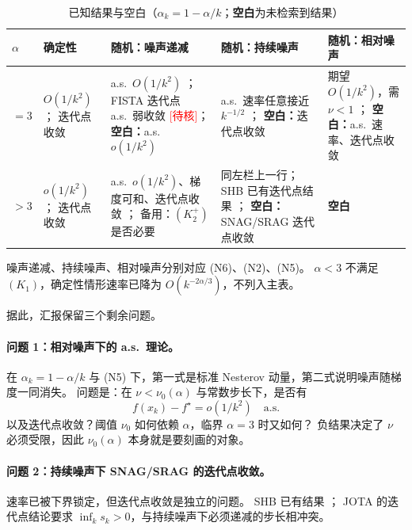 \documentclass[11pt]{ctexart}
\newcommand{\tbv}{\textcolor{red}{[待核]}}
\begin{document}
\begin{table}[htbp]
\centering
\small
\renewcommand{\arraystretch}{1.3}
\caption{已知结果与空白（$\alpha_k=1-\alpha/k$；\textbf{空白}为未检索到结果）}
\label{tab:gaps}
\begin{tabularx}{\textwidth}{@{}p{1.0cm}YYYY@{}}
\toprule
$\alpha$ & 确定性 & 随机：噪声递减 & 随机：持续噪声 & 随机：相对噪声 \\
\midrule
$=3$
& $O(1/k^2)$ \citep{nesterov1983,beck2009fista}；
  迭代点收敛 \citep{jang2025point,bot2025iterates}
& a.s.\ $O(1/k^2)$ \citep{attouch2026ravine}；
  FISTA 迭代点 a.s.\ 弱收敛 \citep{salzo2025iterates}\tbv；
  \textbf{空白：}a.s.\ $o(1/k^2)$
& a.s.\ 速率任意接近 $k^{-1/2}$ \citep{attouch2026ravine}；
  \textbf{空白：}迭代点收敛
& 期望 $O(1/k^2)$，需 $\nu<1$ \citep{gupta2024nesterov}；
  \textbf{空白：}a.s.\ 速率、迭代点收敛 \\
\addlinespace
$>3$
& $o(1/k^2)$ \citep{attouch2016rate}；
  迭代点收敛 \citep{chambolle2015}
& a.s.\ $o(1/k^2)$、梯度可和、迭代点收敛 \citep{attouch2026ravine}；
  备用：$(K_2^+)$ 是否必要
& 同左栏上一行；SHB 已有迭代点结果 \citep{sebbouh2021,liu2022}；
  \textbf{空白：}SNAG/SRAG 迭代点收敛
& \textbf{空白} \\
\bottomrule
\end{tabularx}

\vspace{2mm}
\begin{minipage}{0.96\textwidth}
\footnotesize
噪声递减、持续噪声、相对噪声分别对应 (N6)、(N2)、(N5)。
$\alpha<3$ 不满足 $(K_1)$，确定性情形速率已降为 $O(k^{-2\alpha/3})$，不列入主表。
\end{minipage}
\end{table}

据此，汇报保留三个剩余问题。

\paragraph{问题 1：相对噪声下的 a.s.\ 理论。}
在 $\alpha_k=1-\alpha/k$ 与 (N5) 下，第一式是标准 Nesterov 动量，第二式说明噪声随梯度一同消失。
问题是：在 $\nu<\nu_0(\alpha)$ 与常数步长下，是否有
\[
f(x_k)-f^\star=o(1/k^2)\quad\text{a.s.}
\]
以及迭代点收敛？阈值 $\nu_0$ 如何依赖 $\alpha$，临界 $\alpha=3$ 时又如何？
负结果决定了 $\nu$ 必须受限，因此 $\nu_0(\alpha)$ 本身就是要刻画的对象。

\paragraph{问题 2：持续噪声下 SNAG/SRAG 的迭代点收敛。}
速率已被下界锁定，但迭代点收敛是独立的问题。
SHB 已有结果 \citep{sebbouh2021,liu2022}；
JOTA 的迭代点结论要求 $\inf_k s_k>0$，与持续噪声下必须递减的步长相冲突。
\end{document}
